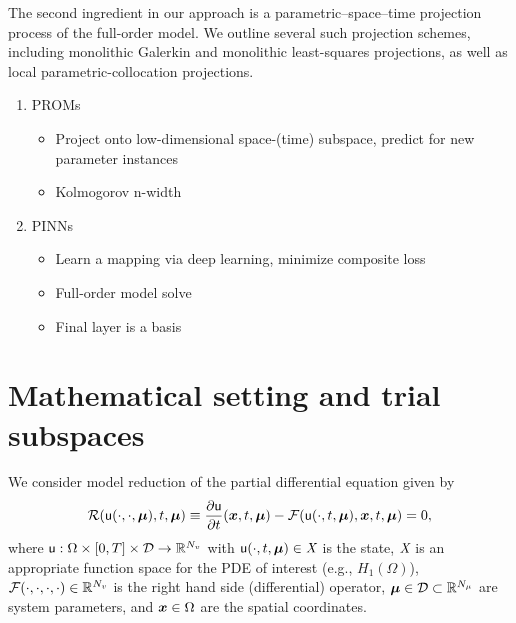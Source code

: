 \documentclass[3p,computermodern,10pt]{elsarticle}
\begin{document}
The second ingredient in our approach is a parametric--space--time projection process of the full-order model. We outline several such projection schemes, including monolithic Galerkin and monolithic least-squares projections, as well as local parametric-collocation projections.  
  
\begin{enumerate}
\item PROMs
\begin{itemize}
\item Project onto low-dimensional space-(time) subspace, predict for new parameter instances
\item Kolmogorov n-width
\end{itemize}
\item PINNs
\begin{itemize}
\item Learn a mapping via deep learning, minimize composite loss
\item Full-order model solve
\item Final layer is a basis
\end{itemize}
\end{enumerate}  
\section{Mathematical setting and trial subspaces}
We consider model reduction of the partial differential equation given by
\begin{equation}\label{eq:fom}
\mathcal{R}(\mathsf{u}(\cdot,\cdot,\boldsymbol \mu),t,\boldsymbol \mu) \equiv \frac{\partial \mathsf{u}}{\partial t}(\boldsymbol x, t,\boldsymbol \mu) - \mathcal{F}(\mathsf{u}(\cdot,t,\boldsymbol \mu),\boldsymbol x, t,\boldsymbol \mu) = 0, 
\end{equation}
where $\mathsf{u}: \Omega \times [0,T] \times \mathcal{D} \rightarrow \mathbb{R}^{N_v}$ with $\mathsf{u}(\cdot,t,\boldsymbol \mu) \in \textit{X}$ is the state, $\textit{X}$ is an appropriate function space for the PDE of interest (e.g., $H_1(\Omega)$), $\mathcal{F}(\cdot,\cdot,\cdot,\cdot) \in \mathbb{R}^{N_v}$ is the right hand side (differential) operator, $\boldsymbol \mu \in \mathcal{D} \subset \mathbb{R}^{N_{\mu}}$  are system parameters, and $\boldsymbol x \in \Omega$ are the spatial coordinates.
\end{document}
